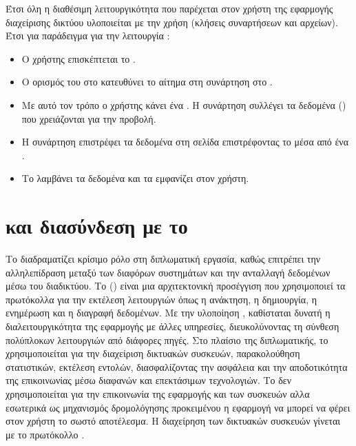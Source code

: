 \FloatBarrier

Έτσι όλη η διαθέσιμη λειτουργικότητα που παρέχεται στον χρήστη της εφαρμογής διαχείρισης δικτύου υλοποιείται με την χρήση  (κλήσεις συναρτήσεων και  αρχείων). Έτσι για παράδειγμα για την λειτουργία  : 

\begin{itemize}
    \item Ο χρήστης επισκέπτεται το  . 
    \item Ο ορισμός του  στο  κατευθύνει το αίτημα στη συνάρτηση  στο .
    \item Με αυτό τον τρόπο ο χρήστης κάνει ένα . Η συνάρτηση  συλλέγει τα δεδομένα () που χρειάζονται για την προβολή.
    \item Η συνάρτηση  επιστρέφει τα δεδομένα στη σελίδα  επιστρέφοντας το μέσα από ένα .
    \item Το   λαμβάνει τα δεδομένα και τα εμφανίζει στον χρήστη.
\end{itemize}


\section{ και διασύνδεση με το }

 Το  διαδραματίζει κρίσιμο ρόλο στη 
διπλωματική εργασία, καθώς επιτρέπει την αλληλεπίδραση μεταξύ των 
διαφόρων συστημάτων και την ανταλλαγή δεδομένων μέσω του διαδικτύου. 
Το  () είναι μια 
αρχιτεκτονική προσέγγιση που χρησιμοποιεί τα πρωτόκολλα  
για την εκτέλεση λειτουργιών όπως η ανάκτηση, η δημιουργία, η 
ενημέρωση και η διαγραφή δεδομένων. Με την υλοποίηση , 
καθίσταται δυνατή η διαλειτουργικότητα της εφαρμογής με άλλες 
υπηρεσίες, διευκολύνοντας τη σύνθεση πολύπλοκων λειτουργιών από 
διάφορες πηγές. Στο πλαίσιο της διπλωματικής, το  
χρησιμοποιείται για την διαχείριση δικτυακών συσκευών, παρακολούθηση 
στατιστικών, εκτέλεση εντολών, διασφαλίζοντας την ασφάλεια και την 
αποδοτικότητα της επικοινωνίας μέσω διαφανών και επεκτάσιμων 
τεχνολογιών. Το  δεν χρησιμοποιείται για την επικοινωνία της εφαρμογής
και των συσκευών αλλα εσωτερικά ως μηχανισμός δρομολόγησης προκειμένου η εφαρμογή
να μπορεί να φέρει στον χρήστη το σωστό αποτέλεσμα. Η διαχείρηση των δικτυακών
συσκευών γίνεται με το πρωτόκολλο .

